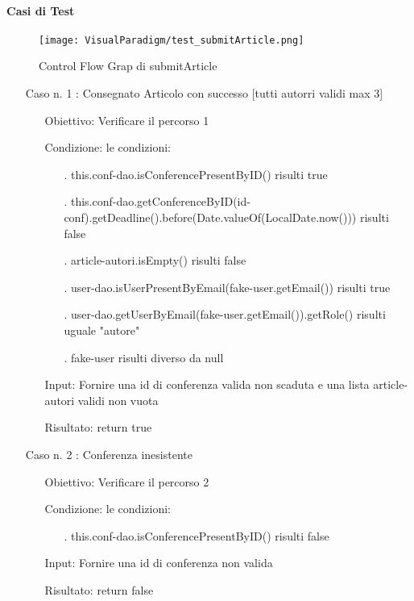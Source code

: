 \paragraph{Casi di Test}
\begin{figure}[ht]
  \centering
  \texttt{[image: VisualParadigm/test\_submitArticle.png]}
  \caption{Control Flow Grap di submitArticle}
  \label{fig:cfg_submitArticle }
\end{figure}
\begin{itemize}
\item[Caso n. 1 :] Consegnato Articolo con successo [tutti autorri validi max 3]
\begin{itemize}
\item[Obiettivo:] Verificare il percorso 1
\item[Condizione:] le condizioni:
\begin{itemize}
\item[.]  this.conf-dao.isConferencePresentByID() risulti true
\item[.]  this.conf-dao.getConferenceByID(id-conf).getDeadline().before(Date.valueOf(LocalDate.now())) risulti false
\item[.] article-autori.isEmpty() risulti false
\item[.] user-dao.isUserPresentByEmail(fake-user.getEmail()) risulti true
\item[.] user-dao.getUserByEmail(fake-user.getEmail()).getRole() risulti uguale "autore" 
\item[.]  fake-user risulti diverso da null
\end{itemize}
\item[Input:] Fornire una id di conferenza valida non scaduta e una lista article-autori validi non vuota 
\item[Risultato:] return true
\end{itemize}
\item[Caso n. 2 :] Conferenza inesistente
\begin{itemize}
\item[Obiettivo:] Verificare il percorso 2
\item[Condizione:] le condizioni:
\begin{itemize}
\item[.] this.conf-dao.isConferencePresentByID() risulti false
\end{itemize}
\item[Input:] Fornire una id di conferenza non valida
\item[Risultato:] return false
\end{itemize}

\end{itemize}
